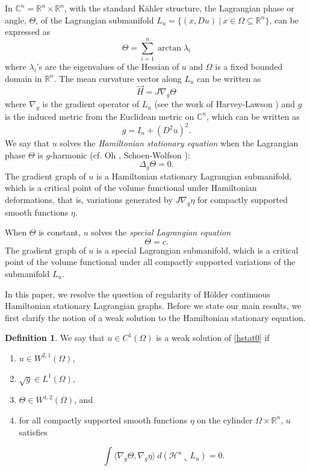 \documentclass[12pt,reqno]{amsart}%
\theoremstyle{plain}
\numberwithin{equation}{section}
\theoremstyle{definition}
\newtheorem{definition}{Definition}
\theoremstyle{remark}
\newcommand{\R}{\mathbb{R}}
\begin{document}
In $\mathbb{C}^{n}= \R^n \times \R^n$, with the standard K\"ahler structure, the Lagrangian phase or angle, $\Theta$, of the Lagrangian submanifold $L_u=\{(x,Du)\:\vert\ x \in \Omega\subseteq \mathbb{R}^n\}$, can be expressed as 
\[
\Theta=\sum_{i=1}^n \arctan \lambda_i
\]
where $\lambda_i$'s are the eigenvalues of the Hessian of $u$ and $\Omega$ is a fixed bounded domain in $\R^n $. The mean curvature vector along
$L_u$ can be written as
\[
\vec{H}=J\nabla_g\Theta
\]
where $\nabla_g$ is the gradient operator of $L_{u}$ (see the work of Harvey-Lawson \cite[(2.19)]{HL}) and $g$ is the induced metric from the Euclidean metric
on $\mathbb{C}^{n}$, which can be written as
\[
g=I_n+(D^{2}u)^{2}.
\]
We say that $u$ solves the \textit{Hamiltonian stationary equation}  when the Lagrangian phase $\Theta$ is $g$-harmonic (cf. Oh \cite{Oh}, Schoen-Wolfson \cite[Proposition 2.2]{SW03}):
\begin{equation}
\Delta_g\Theta=0 \label{hstat0}.
\end{equation}
The gradient graph of $u$ is a Hamiltonian stationary Lagrangian submanifold, which is a critical point of the volume functional under Hamiltonian deformations, that is, variations generated by $J\nabla_g \eta$ for compactly supported smooth functions $\eta$.

When $\Theta$ is constant, $u$ solves the \textit{special Lagrangian equation}\begin{equation}
   \Theta=c. \label{slag}
\end{equation}
The gradient graph of $u$ is a special Lagrangian submanifold, which is a critical point of the volume functional under all compactly supported variations of the submanifold $L_u$. 









In this paper, we resolve the question of regularity of H\"older continuous Hamiltonian stationary Lagrangian graphs. Before we state our main results, we first clarify the notion of a weak solution to the Hamiltonian stationary equation.



\begin{definition} \label{def1}
    We say that $u \in C^1( \Omega)$ is a weak solution of \eqref{hstat0} if 
\begin{enumerate} 
\item $u \in W^{2,1}( \Omega)$,
\item $\sqrt{  g }  \in L^1(\Omega)$,
\item $\Theta \in W^{1,2} ( \Omega)$, and
\item for all compactly supported smooth functions $\eta $ on the cylinder $\Omega \times \R^n$, $u$ satisfies

\[\displaystyle \int  \langle \nabla_g \Theta , \nabla_g \eta\rangle \: d (\mathcal{H}^n  \llcorner L_u) =0.\]  
\end{enumerate}
\end{definition}
\end{document}
